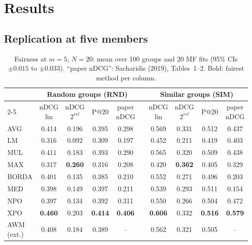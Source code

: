 \documentclass[11pt,a4paper]{article}
\newcommand{\npo}{NPO}
\newcommand{\xpo}{XPO}
\newcommand{\B}[1]{\textbf{#1}}
\begin{document}
\section{Results}

\subsection{Replication at five members}

\begin{table}[t]
\centering\footnotesize
\setlength{\tabcolsep}{3.4pt}
\begin{tabular}{l cccc c cccc}
\toprule
 & \multicolumn{4}{c}{Random groups (RND)} && \multicolumn{4}{c}{Similar groups (SIM)}\\
\cmidrule{2-5}\cmidrule{7-10}
 & nDCG lin & nDCG $2^{rel}$ & P@20 & paper nDCG && nDCG lin & nDCG $2^{rel}$ & P@20 & paper nDCG\\
\midrule
AVG   & 0.414 & 0.196 & 0.395 & 0.298 && 0.569 & 0.331 & 0.512 & 0.437\\
LM    & 0.316 & 0.092 & 0.309 & 0.197 && 0.452 & 0.211 & 0.419 & 0.403\\
MUL   & 0.411 & 0.183 & 0.393 & 0.290 && 0.565 & 0.320 & 0.509 & 0.438\\
MAX   & 0.317 & \B{0.260} & 0.316 & 0.208 && 0.420 & \B{0.362} & 0.405 & 0.329\\
BORDA & 0.401 & 0.135 & 0.385 & 0.210 && 0.552 & 0.271 & 0.496 & 0.203\\
MED   & 0.398 & 0.149 & 0.397 & 0.211 && 0.539 & 0.293 & 0.511 & 0.154\\
\npo  & 0.397 & 0.134 & 0.392 & 0.311 && 0.550 & 0.266 & 0.504 & 0.472\\
\xpo  & \B{0.460} & 0.203 & \B{0.414} & \B{0.406} && \B{0.606} & 0.332 & \B{0.516} & \B{0.579}\\
\midrule
AWM (ext.) & 0.408 & 0.184 & 0.389 & -- && 0.562 & 0.321 & 0.505 & --\\
\bottomrule
\end{tabular}
\caption{Fairness at $m=5$, $N=20$: mean over 100 groups and 20 MF fits
(95\% CIs $\pm0.015$ to $\pm0.033$). ``paper nDCG'': Sacharidis (2019),
Tables~1--2. Bold: fairest method per column.}
\label{tab:e1}
\end{table}
\end{document}
